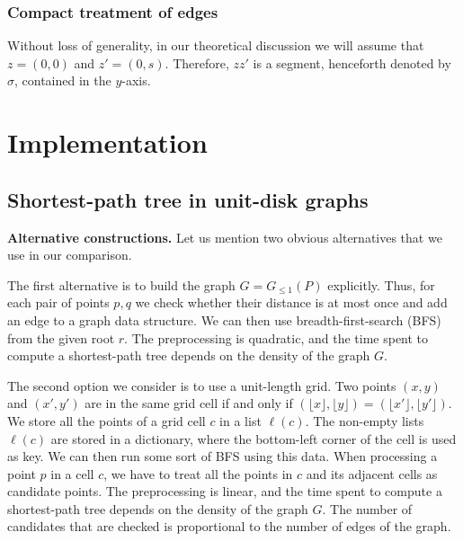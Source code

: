 \documentclass[a4paper,USenglish,numberwithinsect]{lipics}
\newcommand{\GG}{\ensuremath{G_{\le 1}}}
\let\le\leqslant
\def\myparagraph#1{\medskip\noindent\textbf{#1.}}
\begin{document}
\subsubsection{Compact treatment of edges}
\label{sec:quadratic}

Without loss of generality, in our theoretical discussion we will assume
that $z=(0,0)$ and $z'=(0,s)$. Therefore, $zz'$ is a segment, henceforth denoted by $\sigma$,
contained in the $y$-axis.




\section{Implementation}
\label{sec:implementation}

\subsection{Shortest-path tree in unit-disk graphs}
\label{sec:implementation-sptree}

\myparagraph{Alternative constructions} 
Let us mention two obvious alternatives that we use in our comparison.

The first alternative is to build the graph $G=\GG(P)$ explicitly. 
Thus, for each pair of points $p,q$ we check whether their distance is
at most once and add an edge to a graph data structure.
We can then use breadth-first-search (BFS) from the given root $r$.
The preprocessing is quadratic, and the time spent to compute
a shortest-path tree depends on the density of the graph $G$.

The second option we consider is to use a unit-length grid. 
Two points $(x,y)$ and $(x',y')$ are in the same grid cell
if and only if 
$(\lfloor x\rfloor ,\lfloor y\rfloor)=(\lfloor x'\rfloor ,\lfloor y'\rfloor)$.
We store all the points of a grid cell $c$ in a list $\ell(c)$.
The non-empty lists $\ell(c)$ are stored in a dictionary,
where the bottom-left corner of the cell is used as key.
We can then run some sort of BFS using this data. When processing
a point $p$ in a cell $c$, we have to treat all the points 
in $c$ and its adjacent cells as candidate points. 
The preprocessing is linear, and the time spent to compute
a shortest-path tree depends on the density of the graph $G$.
The number of candidates that are checked is proportional to the
number of edges of the graph.
\end{document}
